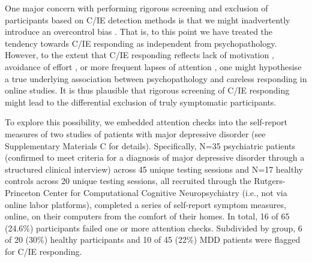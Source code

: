 \documentclass[a4paper,notitlepage,12pt]{article}
\begin{document}
One major concern with performing rigorous screening and exclusion of participants based on C/IE detection methods is that we might inadvertently introduce an overcontrol bias \cite{elwert2014endogenous}. That is, to this point we have treated the tendency towards C/IE responding as independent from psychopathology. However, to the extent that C/IE responding reflects lack of motivation \cite{barch2015mechanisms}, avoidance of effort \cite{cohen2001impairments, culbreth2016negative}, or more frequent lapses of attention \cite{kane2016individual, robison2017neurotic}, one might hypothesise a true underlying association between psychopathology and careless responding in online studies. It is thus plausible that rigorous screening of C/IE responding might lead to the differential exclusion of truly symptomatic participants. 

To explore this possibility, we embedded attention checks into the self-report measures of two studies of patients with major depressive disorder (see Supplementary Materials C for details). Specifically, N=35 psychiatric patients (confirmed to meet criteria for a diagnosis of major depressive disorder through a structured clinical interview) across 45 unique testing sessions and N=17 healthy controls across 20 unique testing sessions, all recruited through the Rutgers-Princeton Center for Computational Cognitive Neuropsychiatry (i.e., not via online labor platforms), completed a series of self-report symptom measures, online, on their computers from the comfort of their homes. In total, 16 of 65 (24.6\%) participants failed one or more attention checks. Subdivided by group, 6 of 20 (30\%) healthy participants and 10 of 45 (22\%) MDD patients were flagged for C/IE responding.
\end{document}
